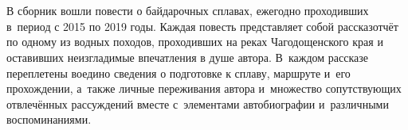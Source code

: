 \chapter*{}

В сборник вошли повести о байдарочных сплавах, ежегодно проходивших в~период с 2015 по 2019 годы. Каждая повесть представляет собой рассказ\sdash отчёт по одному из водных походов, проходивших на реках Чагодощенского края и оставивших неизгладимые впечатления в душе автора. В~каждом рассказе переплетены воедино сведения о подготовке к сплаву, маршруте и~его прохождении, а~также личные переживания автора и~множество сопутствующих отвлечённых рассуждений вместе с~элементами автобиографии и~различными воспоминаниями.

